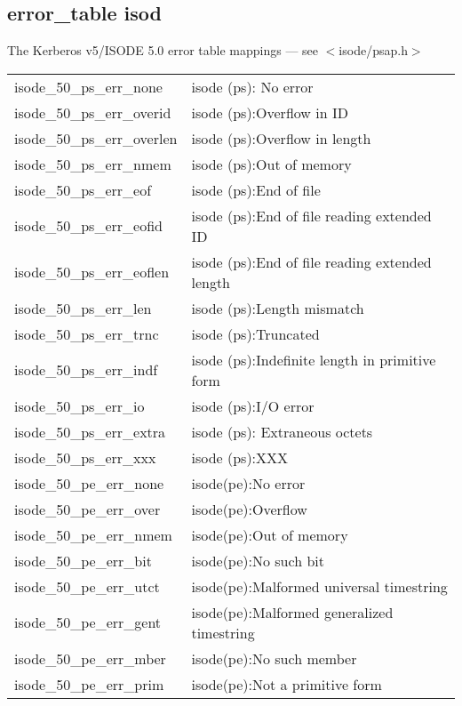 \subsection{error_table isod}


 The Kerberos v5/ISODE 5.0 error table mappings --- see $<$isode/psap.h$>$

\begin{small}
\begin{tabular}{ll} 
{\sc isode_50_ps_err_none}& isode (ps): No error \\
{\sc isode_50_ps_err_overid}& isode (ps):Overflow in ID \\
{\sc isode_50_ps_err_overlen}& isode (ps):Overflow in length \\
{\sc isode_50_ps_err_nmem}& isode (ps):Out of memory \\
{\sc isode_50_ps_err_eof}& isode (ps):End of file \\
{\sc isode_50_ps_err_eofid}& isode (ps):End of file reading extended ID \\
{\sc isode_50_ps_err_eoflen}& isode (ps):End of file reading extended length \\
{\sc isode_50_ps_err_len}& isode (ps):Length mismatch \\
{\sc isode_50_ps_err_trnc}& isode (ps):Truncated \\
{\sc isode_50_ps_err_indf}& isode (ps):Indefinite length in primitive form \\
{\sc isode_50_ps_err_io}& isode (ps):I/O error \\
{\sc isode_50_ps_err_extra}& isode (ps): Extraneous octets \\
{\sc isode_50_ps_err_xxx}& isode (ps):XXX \\
{\sc isode_50_pe_err_none}& isode(pe):No error \\
{\sc isode_50_pe_err_over}& isode(pe):Overflow \\
{\sc isode_50_pe_err_nmem}& isode(pe):Out of memory \\
{\sc isode_50_pe_err_bit}& isode(pe):No such bit \\
{\sc isode_50_pe_err_utct}& isode(pe):Malformed universal timestring \\
{\sc isode_50_pe_err_gent}& isode(pe):Malformed generalized timestring \\
{\sc isode_50_pe_err_mber}& isode(pe):No such member \\
{\sc isode_50_pe_err_prim}& isode(pe):Not a primitive form \\

\end{tabular}
\end{small}
